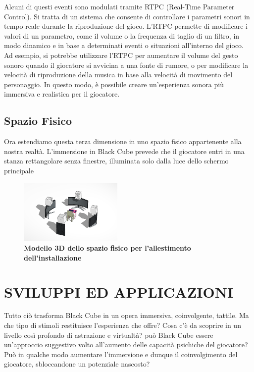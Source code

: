 	Alcuni di questi eventi sono modulati tramite RTPC (Real-Time Parameter Control). Si tratta di un sistema che consente di controllare i parametri sonori in tempo reale durante la riproduzione del gioco. 
	L'RTPC permette di modificare i valori di un parametro, come il volume o la frequenza di taglio di un filtro, in modo dinamico e in base a determinati eventi o situazioni all'interno del gioco. Ad esempio, si potrebbe utilizzare l'RTPC per aumentare il volume del gesto sonoro quando il giocatore si avvicina a una fonte di rumore, o per modificare la velocità di riproduzione della musica in base alla velocità di movimento del personaggio. In questo modo, è possibile creare un'esperienza sonora più immersiva e realistica per il giocatore.
	
	\subsection*{Spazio Fisico}
	Ora estendiamo questa terza dimensione in uno spazio fisico appartenente alla nostra realtà. L'immersione in Black Cube prevede che il giocatore entri in una stanza rettangolare senza finestre, illuminata solo dalla luce dello schermo principale
	
	\begin{figure}[h]
		\begin{center}
			\includegraphics[width=5cm]{img/image1.png}
			\caption{\textbf{Modello 3D dello spazio fisico per l'allestimento dell'installazione}}
				\label{gr01}
		\end{center}
	\end{figure}
	
\section*{SVILUPPI ED APPLICAZIONI}
Tutto ciò trasforma Black Cube in un opera immersiva, coinvolgente, tattile. Ma che tipo di stimoli restituisce l'esperienza che offre? Cosa c'è da scoprire in un livello così profondo di astrazione e virtualtà? può Black Cube essere un'approccio suggestivo volto all'aumento delle capacità psichiche del giocatore? Può in qualche modo aumentare l'immersione e dunque il coinvolgimento del giocatore, sbloccandone un potenziale nascosto?


